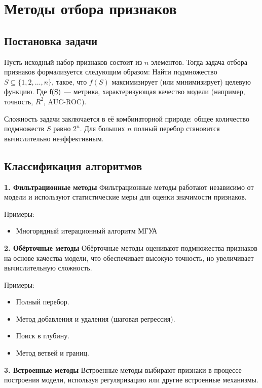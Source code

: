 \section{Методы отбора признаков}


\subsection*{Постановка задачи}
Пусть исходный набор признаков состоит из \( n \) элементов. Тогда задача отбора признаков формализуется следующим образом:
Найти подмножество $S \subseteq \{1, 2, \dots, n\}$, такое, что $f(S)$ максимизирует (или минимизирует) целевую функцию. Где \( $f(S)$ \) — метрика, характеризующая качество модели (например, точность, $ R^2 $, AUC-ROC).

Сложность задачи заключается в её комбинаторной природе: общее количество подмножеств \( S \) равно \( 2^n \). Для больших \( n \) полный перебор становится вычислительно неэффективным.

\subsection*{Классификация алгоритмов}

\textbf{1. Фильтрационные методы}
Фильтрационные методы работают независимо от модели и используют статистические меры для оценки значимости признаков.

Примеры:
\begin{itemize}
    \item Многорядный итерационный алгоритм МГУА
\end{itemize}

\textbf{2. Обёрточные методы}
Обёрточные методы оценивают подмножества признаков на основе качества модели, что обеспечивает высокую точность, но увеличивает вычислительную сложность.

Примеры:
\begin{itemize}
    \item Полный перебор.
    \item Метод добавления и удаления (шаговая регрессия).
    \item Поиск в глубину.
    \item Метод ветвей и границ.
\end{itemize}

\textbf{3. Встроенные методы}
Встроенные методы выбирают признаки в процессе построения модели, используя регуляризацию или другие встроенные механизмы.

